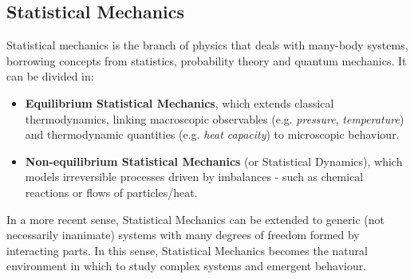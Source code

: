 \documentclass[../template.tex]{subfiles}
\begin{document}
\subsection{Statistical Mechanics}
Statistical mechanics is the branch of physics that deals with many-body systems, borrowing concepts from statistics, probability theory and quantum mechanics. It can be divided in:
\begin{itemize}
    \item \textbf{Equilibrium Statistical Mechanics}, which extends classical thermodynamics, linking macroscopic observables (e.g. \textit{pressure}, \textit{temperature}) and thermodynamic quantities (e.g. \textit{heat capacity}) to microscopic behaviour. 
    \item \textbf{Non-equilibrium Statistical Mechanics} (or Statistical Dynamics), which models irreversible processes driven by imbalances - such as chemical reactions or flows of particles/heat. 
\end{itemize}
In a more recent sense, Statistical Mechanics can be extended to generic (not necessarily inanimate) systems with many degrees of freedom formed by interacting parts. In this sense, Statistical Mechanics becomes the natural environment in which to study complex systems and emergent behaviour.
\end{document}
